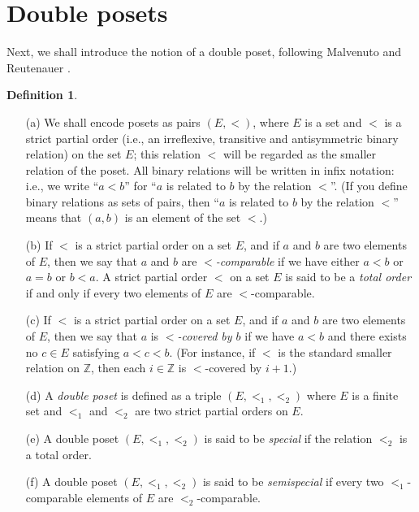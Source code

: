\documentclass[12pt]{article}
\theoremstyle{plain}
\theoremstyle{definition}
\newtheorem{definition}[theorem]{Definition}
\theoremstyle{remark}
\newcommand{\ZZ}{{\mathbb{Z}}}
\begin{document}
\section{Double posets}
\label{sect.double-posets}

Next, we shall introduce the notion of a double poset, following
Malvenuto and Reutenauer \cite{Mal-Reu-DP}.

\begin{definition}
\label{def.double-poset}
\begin{itemize}

\item[(a)] We shall encode posets as pairs $\left(E, <\right)$,
where $E$ is a set and $<$ is a strict partial order
(i.e., an irreflexive, transitive and antisymmetric
binary relation) on the set $E$; this relation $<$ will be regarded
as the smaller relation of the poset. All binary relations will be
written in infix notation: i.e., we write ``$a < b$'' for ``$a$ is
related to $b$ by the relation $<$''. (If you define binary relations
as sets of pairs, then ``$a$ is related to $b$ by the relation $<$''
means that $\left(a,b\right)$ is an element of the set $<$.)

\item[(b)] If $<$ is a strict partial order on a set $E$,
and if $a$ and $b$ are two elements of $E$, then we say that
$a$ and $b$ are \textit{$<$-comparable} if we have either $a < b$
or $a = b$ or $b < a$. A strict partial order $<$ on a
set $E$ is said to be a \textit{total order} if and only
if every two elements of $E$ are $<$-comparable.

\item[(c)] If $<$ is a strict partial order on a set $E$,
and if $a$ and $b$ are two elements of $E$, then we say that
$a$ is \textit{$<$-covered by $b$} if we have $a < b$ and there
exists no $c \in E$ satisfying $a < c < b$. (For instance, if $<$
is the standard smaller relation on $\ZZ$, then each
$i \in \ZZ$ is $<$-covered by $i+1$.)

\item[(d)] A \textit{double poset} is defined as a triple
$\left(E, <_1, <_2\right)$ where $E$ is a finite set and $<_1$ and
$<_2$ are two strict partial orders on $E$.

\item[(e)] A double poset
$\left(E, <_1, <_2\right)$ is said to be \textit{special} if
the relation $<_2$ is a total order.

\item[(f)] A double poset
$\left(E, <_1, <_2\right)$ is said to be \textit{semispecial} if
every two $<_1$-comparable elements of $E$ are $<_2$-comparable.


\end{itemize}
\end{definition}
\end{document}
